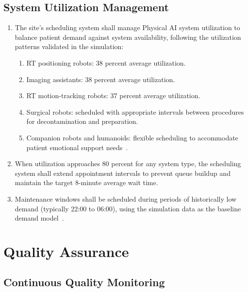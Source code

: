 \documentclass[11pt,letterpaper]{article}
\begin{document}
\subsection{System Utilization Management}

\begin{enumerate}[label=(\alph*)]
\item The site's scheduling system shall manage Physical AI system utilization
  to balance patient demand against system availability, following the
  utilization patterns validated in the simulation:
  \begin{enumerate}[label=(\arabic*)]
  \item RT positioning robots: 38 percent average utilization.
  \item Imaging assistants: 38 percent average utilization.
  \item RT motion-tracking robots: 37 percent average utilization.
  \item Surgical robots: scheduled with appropriate intervals between
    procedures for decontamination and preparation.
  \item Companion robots and humanoids: flexible scheduling to accommodate
    patient emotional support needs~\cite{newtrial2026}.
  \end{enumerate}

\item When utilization approaches 80 percent for any system type, the
  scheduling system shall extend appointment intervals to prevent queue
  buildup and maintain the target 8-minute average wait time.

\item Maintenance windows shall be scheduled during periods of historically
  low demand (typically 22:00 to 06:00), using the simulation data as the
  baseline demand model~\cite{newtrial2026}.
\end{enumerate}

\section{Quality Assurance}

\subsection{Continuous Quality Monitoring}
\end{document}
